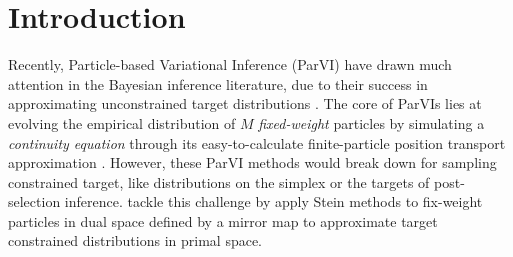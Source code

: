 \section{Introduction}

Recently, Particle-based Variational Inference (ParVI) have drawn much attention 
in the Bayesian inference literature, due to their success 
in approximating unconstrained target distributions
    \cite{liu2016stein,liu2018riemannian,liu2018stein,pu2017vae,zhu2020variance}. 
The core of ParVIs lies at evolving the empirical distribution of $M$ \emph{fixed-weight} particles by simulating a \emph{continuity equation} 
through its easy-to-calculate finite-particle position transport approximation 
\cite{liu2019understanding}. 
However, these ParVI methods would break down for sampling constrained target, like distributions on the simplex 
or the targets of post-selection inference.
\cite{shi2022sampling} tackle this challenge by apply Stein methods to fix-weight particles in dual space defined by
a mirror map to approximate target constrained distributions in primal space.





